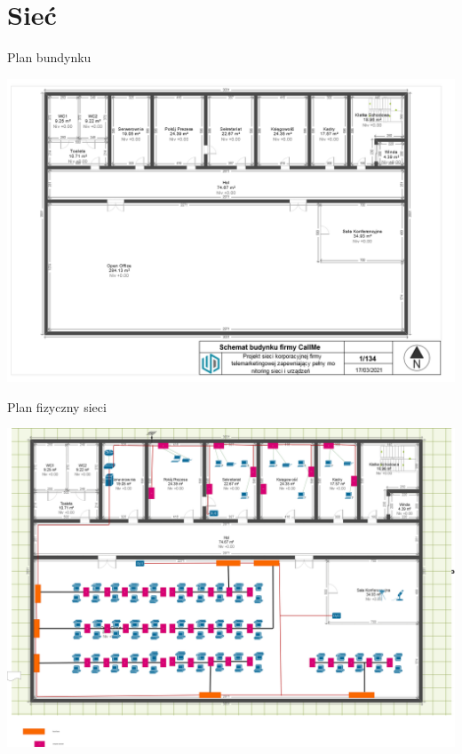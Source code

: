\documentclass[presentation]{beamer}
\begin{document}
\section{Sieć}
\label{sec:org7854ec3}
\begin{frame}[label={sec:orgd79c7e6}]{Plan bundynku}
\begin{center}
\includegraphics[width=.9\linewidth]{./data/siec/plan_budynku.png}
\end{center}
\end{frame}
\begin{frame}[label={sec:org0ae8d1f}]{Plan fizyczny sieci}
\begin{center}
\includegraphics[width=.9\linewidth]{./data/siec/plan_fizyczny.png}
\end{center}
\end{frame}
\end{document}
